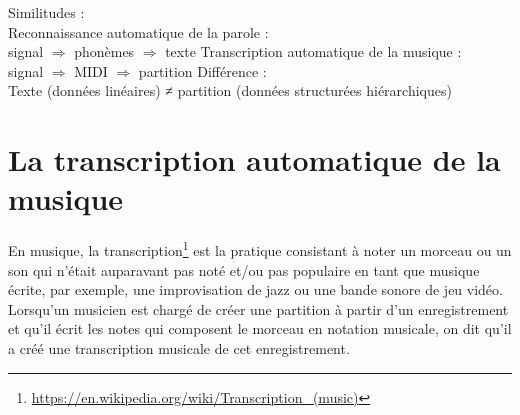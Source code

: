 Similitudes :\\
Reconnaissance automatique de la parole :\\
signal $\Rightarrow$ phonèmes $\Rightarrow$ texte
Transcription automatique de la musique :\\
signal $\Rightarrow$ MIDI $\Rightarrow$ partition
Différence :\\
Texte (données linéaires) ≠ partition (données structurées hiérarchiques)

\section{La transcription automatique de la musique}
En musique, la transcription\footnote{\url{https://en.wikipedia.org/wiki/Transcription_(music)}} 
est la pratique consistant à noter un morceau ou un son qui n'était auparavant pas noté et/ou pas populaire en tant que musique écrite, par exemple, une improvisation de jazz ou une bande sonore de jeu vidéo. Lorsqu'un musicien est chargé de créer une partition à partir d'un enregistrement et qu'il écrit les notes qui composent le morceau en notation musicale, on dit qu'il a créé une transcription musicale de cet enregistrement.

